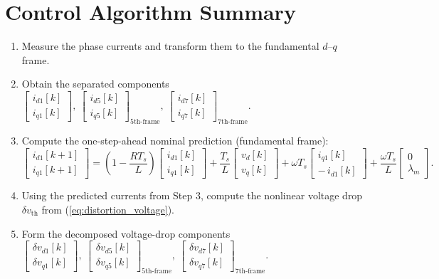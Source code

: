 \section{Control Algorithm Summary}

\begin{enumerate}
  \item Measure the phase currents and transform them to the fundamental $d$–$q$ frame.

  \item Obtain the separated components
  $
  \begin{bmatrix} i_{d1}[k]\\ i_{q1}[k]\end{bmatrix},\ 
  \begin{bmatrix} i_{d5}[k]\\ i_{q5}[k]\end{bmatrix}_{\text{5th-frame}},\ 
  \begin{bmatrix} i_{d7}[k]\\ i_{q7}[k]\end{bmatrix}_{\text{7th-frame}}.
  $

  \item Compute the one-step-ahead nominal prediction (fundamental frame):
  \[
  \begin{bmatrix} i_{d1}[k+1]\\ i_{q1}[k+1]\end{bmatrix}
  =
  \left(1-\frac{R T_s}{L}\right)
  \begin{bmatrix} i_{d1}[k]\\ i_{q1}[k]\end{bmatrix}
  + \frac{T_s}{L}\begin{bmatrix} v_d[k]\\ v_q[k]\end{bmatrix}
  + \omega T_s \begin{bmatrix} i_{q1}[k]\\ -\,i_{d1}[k]\end{bmatrix}
  + \frac{\omega T_s}{L}\begin{bmatrix} 0\\ \lambda_m\end{bmatrix}.
  \]

  \item Using the predicted currents from Step 3, compute the nonlinear voltage drop $\delta v_{\mathrm{th}}$ from (\ref{eq:distortion_voltage}).

  \item Form the decomposed voltage-drop components
  $
  \begin{bmatrix}\delta v_{d1}[k]\\ \delta v_{q1}[k]\end{bmatrix},\
  \begin{bmatrix}\delta v_{d5}[k]\\ \delta v_{q5}[k]\end{bmatrix}_{\text{5th-frame}},\
  \begin{bmatrix}\delta v_{d7}[k]\\ \delta v_{q7}[k]\end{bmatrix}_{\text{7th-frame}}.
  $


\end{enumerate}
